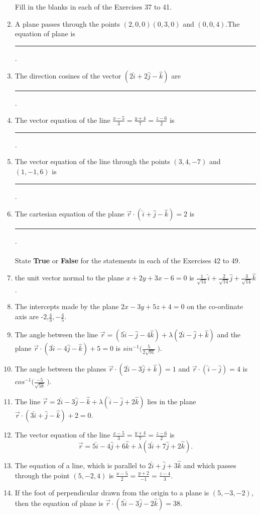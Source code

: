 \documentclass[12pt]{article}
\begin{document}
\begin{enumerate}
Fill in the blanks in each of the Exercises 37 to 41.
\item A plane passes through the points $(2,0,0) (0,3,0)$ and $(0,0,4)$.The equation of plane is \noindent\rule{2cm}{0.4pt}.
\item The direction cosines of the vector $(2\hat{i}+2\hat{j}-\hat{k})$ are \noindent\rule{2cm}{0.4pt}.
\item The vector equation of the line \(\displaystyle \frac{x-5}{3}=\frac{y+4}{7}=\frac{z-6}{2}\) is \noindent\rule{2cm}{0.4pt}. 
\item The vector equation of the line through the points $(3,4,-7)$ and $(1,-1,6)$ is \noindent\rule{2cm}{0.4pt}.
\item The cartesian equation of the plane $\overrightarrow{r} \cdot (\hat{i}+\hat{j}-\hat{k})=2$ is \noindent\rule{2cm}{0.4pt}.
\\\\State \textbf{True} or \textbf{False} for the statements in each of the Exercises 42 to 49.
\item the unit vector normal to the plane $x+2y+3x-6=0$ is \(\displaystyle \frac{1}{\sqrt{14}}\hat{i} + \frac{2}{\sqrt{14}}\hat{j} + \frac{3}{\sqrt{14}}\hat{k}\).
\item The intercepts made by the plane $2x-3y+5z+4=0$ on the co-ordinate axis are -2,\(\displaystyle \frac{4}{3},-\frac{4}{5}\).
\item The angle between the line $\overrightarrow{r}=(5\hat{i}-\hat{j}-4\hat{k})+\lambda(2\hat{i}-\hat{j}+\hat{k})$ and the plane $\overrightarrow{r} \cdot (3\hat{i}-4\hat{j}-\hat{k})+5=0$ is $sin^{-1}\Biggl(\displaystyle\frac{5}{2\sqrt{91}}\ \Biggr)$.
\item The angle between the planes $\overrightarrow{r} \cdot (2\hat{i}-3\hat{j}+\hat{k})=1$ and $\overrightarrow{r} \cdot (\hat{i}-\hat{j})=4$ is $cos^{-1} \Biggl(\displaystyle\frac{-5}{\sqrt{58}}\ \Biggr)$.
\item The line $\overrightarrow{r}=2\hat{i}-3\hat{j}-\hat{k}+\lambda(\hat{i}-\hat{j}+2\hat{k})$ lies in the plane $\overrightarrow{r} \cdot (3\hat{i}+\hat{j}-\hat{k})+2=0$.
\item The vector equation of the line \(\displaystyle\frac{x-5}{3}=\frac{y+4}{7}=\frac{z-6}{2}\) is\\
$$\overrightarrow{r}=5\hat{i}-4\hat{j}+6\hat{k}+\lambda(3\hat{i}+7\hat{j}+2\hat{k}).$$
\item The equation of a line, which is parallel to $2\hat{i}+\hat{j}+3\hat{k}$ and which passes through the point $(5,-2,4)$ is \(\displaystyle \frac{x-5}{2}=\frac{y+2}{-1}=\frac{z-4}{3}\).
\item If the foot of perpendicular drawn from the origin to a plane is $(5,-3,-2)$, then the equation of plane is $\overrightarrow{r} \cdot (5\hat{i}-3\hat{j}-2\hat{k})=38.$
\end{enumerate}
\end{document}

